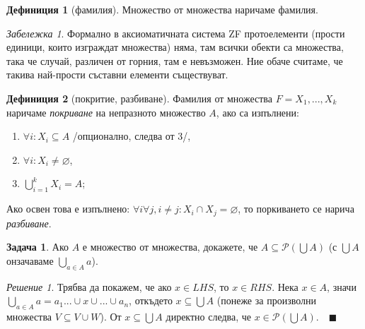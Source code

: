 \documentclass[10pt, a4paper]{article}
\theoremstyle{definition}
\newtheorem{definition}{Дефиниция}[section]
\newtheorem{problem}{Задача}
\theoremstyle{remark}
\newtheorem*{remark}{Забележка}
\newtheorem*{sol}{Решение}
\begin{document}
\hfill
\begin{definition}[фамилия]
    Множество от множества наричаме фамилия.
    \begin{remark}
        Формално в аксиоматичната система ZF протоелементи (прости единици, които изграждат множества) няма, там всички обекти са множества, така че случай, различен от горния, там е невъзможен. Ние обаче считаме, че такива най-прости съставни елементи съществуват.
    \end{remark}
\end{definition}

\begin{definition}[покритие, разбиване]
    Фамилия от множества $F={X_1,...,X_k}$ наричаме \emph{покриване} на непразното множество $A$, ако са изпълнени:
    \begin{enumerate}
        \item $\forall i: X_i\subseteq A$ /опционално, следва от 3/,
        \item $\forall i:X_i\neq\varnothing$,
        \item $\bigcup_{i=1}^k X_i=A$;
    \end{enumerate}
    \item Ако освен това е изпълнено: $\forall i\forall j, i\neq j: X_i\cap X_j=\varnothing$, то поркиването се нарича \emph{разбиване}.
\end{definition}

\hfill
\begin{problem}
    Ако $A$ е множество от множества, докажете, че $A\subseteq\mathcal{P} (\bigcup A)$ (с $\bigcup A$ онзачаваме $\bigcup_{a\in A} a$). 
\end{problem}
\begin{sol}
    Трябва да покажем, че ако $x\in LHS$, то $x\in RHS$. Нека $x\in A$, значи $\bigcup_{a\in A} a= a_1...\cup x\cup... \cup a_n$, откъдето $x\subseteq\bigcup A$ (понеже за произволни множества $V\subseteq V\cup W$). От $x\subseteq\bigcup A$ директно следва, че $x\in\mathcal{P}(\bigcup A)$.$\quad\blacksquare$
\end{sol}
\end{document}
